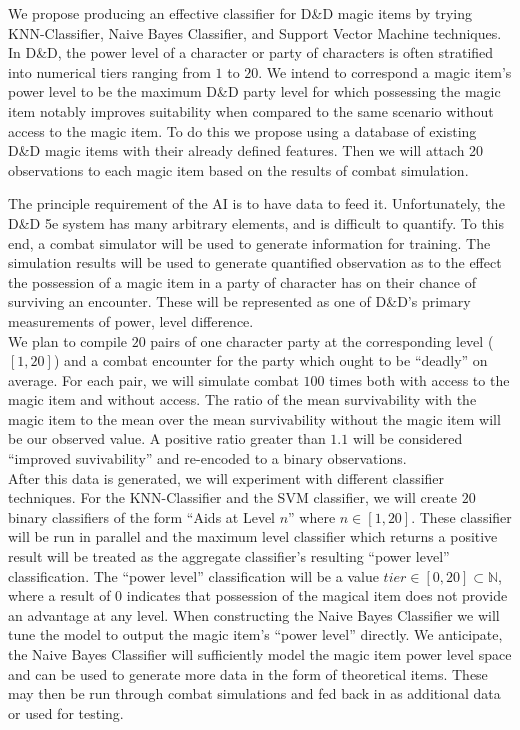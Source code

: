 \documentclass[12pt]{diazessay}
\begin{document}
We propose producing an effective classifier for D\&D magic items by trying KNN-Classifier, Naive Bayes Classifier, and Support Vector Machine techniques.
In D\&D, the power level of a character or party of characters is often stratified into numerical tiers ranging from $1$ to $20$.
We intend to correspond a magic item's power level to be the maximum D\&D party level for which possessing the magic item notably improves suitability when compared to the same scenario without access to the magic item.
To do this we propose using a database of existing D\&D magic items with their already defined features.
Then we will attach 20 observations to each magic item based on the results of combat simulation.

The principle requirement of the AI is to have data to feed it.
Unfortunately, the D\&D 5e system has many arbitrary elements, and is difficult to quantify.
To this end, a combat simulator will be used to generate information for training.
The simulation results will be used to generate quantified observation as to the effect the possession of a magic item in a party of character has on their chance of surviving an encounter.
These will be represented as one of D\&D's primary measurements of power, level difference.\\

We plan to compile $20$ pairs of one character party at the corresponding level ($[1,20]$) and a combat encounter for the party which ought to be ``deadly'' on average.
For each pair, we will simulate combat $100$ times both with access to the magic item and without access.
The ratio of the mean survivability with the magic item to the mean over the mean survivability without the magic item will be our observed value.
A positive ratio greater than $1.1$ will be considered ``improved suvivability'' and re-encoded to a binary observations.\\

After this data is generated, we will experiment with different classifier techniques.
For the KNN-Classifier and the SVM classifier, we will create $20$ binary classifiers of the form ``Aids at Level $n$'' where $n \in [1,20]$.
These classifier will be run in parallel and the maximum level classifier which returns a positive result will be treated as the aggregate classifier's resulting ``power level'' classification.
The ``power level'' classification will be a value $tier \in [0,20] \subset \mathbb{N}$, where a result of $0$ indicates that possession of the magical item does not provide an advantage at any level.
When constructing the Naive Bayes Classifier we will tune the model to output the magic item's ``power level'' directly.
We anticipate, the Naive Bayes Classifier will sufficiently model the magic item power level space and can be used to generate more data in the form of theoretical items.
These may then be run through combat simulations and fed back in as additional data or used for testing.\\
\end{document}
